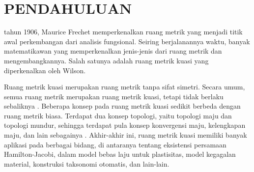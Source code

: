 \documentclass[journal]{IEEEtran}
\theoremstyle{definition}
\theoremstyle{definition}
\theoremstyle{plain}
\begin{document}
    
    
    \IEEEpeerreviewmaketitle
    
     \section{PENDAHULUAN}
     \normalsize {} tahun 1906, Maurice Frechet memperkenalkan ruang metrik yang menjadi titik awal perkembangan dari analisis fungsional. Seiring berjalanannya waktu, banyak matematikawan yang memperkenalkan jenis-jenis dari ruang metrik dan mengembangkannya. Salah satunya adalah ruang metrik kuasi yang diperkenalkan oleh Wilson. 

    Ruang metrik kuasi merupakan ruang metrik tanpa sifat simetri. Secara umum, semua ruang metrik merupakan ruang metrik kuasi, tetapi tidak berlaku sebaliknya \cite{Wilson1931}. Beberapa konsep pada ruang metrik kuasi sedikit berbeda dengan ruang metrik biasa. Terdapat dua konsep topologi, yaitu topologi maju dan topologi mundur, sehingga terdapat pula konsep konvergensi maju, kelengkapan maju, dan lain sebagainya \cite{JuliaCollins2007}. Akhir-akhir ini, ruang metrik kuasi memiliki banyak aplikasi pada berbagai bidang, di antaranya tentang eksistensi persamaan Hamilton-Jacobi, dalam model bebas laju untuk plastisitas, model kegagalan material, konstruksi taksonomi otomatis, dan lain-lain. \cite{Abdelkarim2023}   
    
\end{document}

